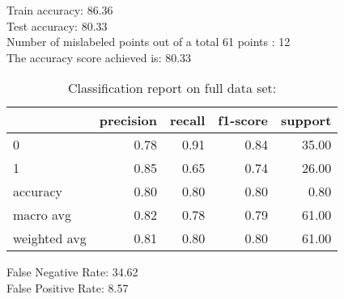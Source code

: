 Train accuracy: 86.36%
\\Test accuracy: 80.33%
\\Number of mislabeled points out of a total 61 points : 12
\\The accuracy score achieved is: 80.33 %
\begin{table}[H]
\caption{Classification report on full data set:}
\begin{center}
\begin{tabular}{lrrrr}
\toprule
{} &  precision &  recall &  f1-score &  support \\
\midrule
0            &       0.78 &    0.91 &      0.84 &    35.00 \\
1            &       0.85 &    0.65 &      0.74 &    26.00 \\
accuracy     &       0.80 &    0.80 &      0.80 &     0.80 \\
macro avg    &       0.82 &    0.78 &      0.79 &    61.00 \\
weighted avg &       0.81 &    0.80 &      0.80 &    61.00 \\
\bottomrule
\end{tabular}

\label{log_reg_class}
\end{center}
\end{table}
\noindent
False Negative Rate: 34.62
\\False Positive Rate: 8.57
